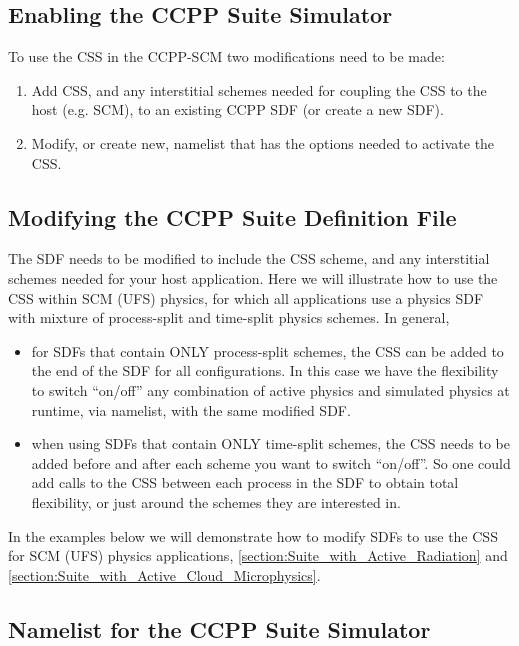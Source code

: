 \subsection{Enabling the CCPP Suite Simulator}

To use the CSS in the CCPP-SCM two modifications need to be made:

\begin{enumerate}
\item Add CSS, and any interstitial schemes needed for coupling the CSS to the host (e.g. SCM), to an existing CCPP SDF (or create a new SDF).
\item Modify, or create new, namelist that has the options needed to activate the CSS.
\end{enumerate}

\subsection{Modifying the CCPP Suite Definition File}

The SDF needs to be modified to include the CSS scheme, and any interstitial schemes needed for your host application. Here we will illustrate how to use the CSS within SCM (UFS) physics, for which all applications use a physics SDF with mixture of process-split and time-split physics schemes.
In general,
\begin{itemize}
\item for SDFs that contain ONLY process-split schemes, the CSS can be added to the end of the SDF for all configurations. In this case we have the flexibility to switch ``on/off'' any combination of active physics and simulated physics at runtime, via namelist, with the same modified SDF.
\item when using SDFs that contain ONLY time-split schemes, the CSS needs to be added before and after each scheme you want to switch ``on/off''. So one could add calls to the CSS between each process in the SDF to obtain total flexibility, or just around the schemes they are interested in.
\end{itemize}

In the examples below we will demonstrate how to modify SDFs to use the CSS for SCM (UFS) physics applications, \ref{section:Suite_with_Active_Radiation} and \ref{section:Suite_with_Active_Cloud_Microphysics}.

\subsection{Namelist for the CCPP Suite Simulator}

